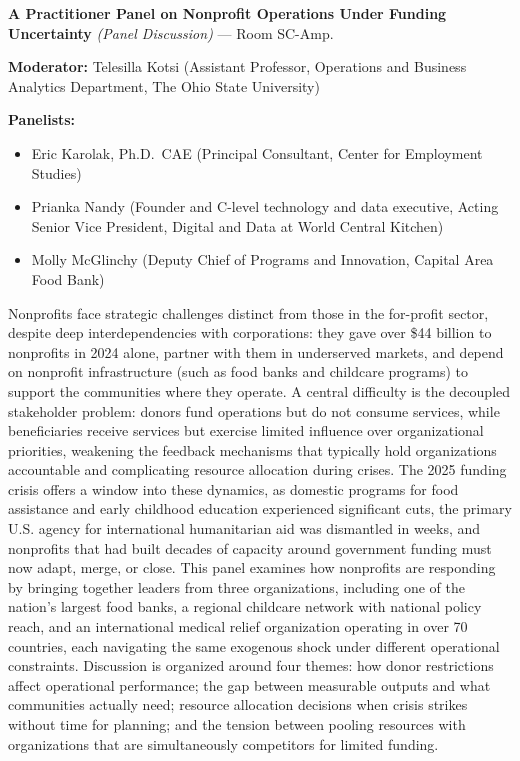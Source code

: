 \documentclass[
  10pt,
  letterpaper,
  DIV=11,
  numbers=noendperiod]{scrartcl}
\providecommand{\tightlist}{%
  \setlength{\itemsep}{0pt}\setlength{\parskip}{0pt}}\usepackage{longtable,booktabs,array}
\begin{document}
\textbf{A Practitioner Panel on Nonprofit Operations Under Funding
Uncertainty} \emph{(Panel Discussion)} --- Room SC-Amp.

\textbf{Moderator:} Telesilla Kotsi (Assistant Professor, Operations and
Business Analytics Department, The Ohio State University)

\textbf{Panelists:}

\begin{itemize}
\tightlist
\item
  Eric Karolak, Ph.D.~CAE (Principal Consultant, Center for Employment
  Studies)
\item
  Prianka Nandy (Founder and C-level technology and data executive,
  Acting Senior Vice President, Digital and Data at World Central
  Kitchen)
\item
  Molly McGlinchy (Deputy Chief of Programs and Innovation, Capital Area
  Food Bank)
\end{itemize}

Nonprofits face strategic challenges distinct from those in the
for-profit sector, despite deep interdependencies with corporations:
they gave over \$44 billion to nonprofits in 2024 alone, partner with
them in underserved markets, and depend on nonprofit infrastructure
(such as food banks and childcare programs) to support the communities
where they operate. A central difficulty is the decoupled stakeholder
problem: donors fund operations but do not consume services, while
beneficiaries receive services but exercise limited influence over
organizational priorities, weakening the feedback mechanisms that
typically hold organizations accountable and complicating resource
allocation during crises. The 2025 funding crisis offers a window into
these dynamics, as domestic programs for food assistance and early
childhood education experienced significant cuts, the primary U.S.
agency for international humanitarian aid was dismantled in weeks, and
nonprofits that had built decades of capacity around government funding
must now adapt, merge, or close. This panel examines how nonprofits are
responding by bringing together leaders from three organizations,
including one of the nation's largest food banks, a regional childcare
network with national policy reach, and an international medical relief
organization operating in over 70 countries, each navigating the same
exogenous shock under different operational constraints. Discussion is
organized around four themes: how donor restrictions affect operational
performance; the gap between measurable outputs and what communities
actually need; resource allocation decisions when crisis strikes without
time for planning; and the tension between pooling resources with
organizations that are simultaneously competitors for limited funding.
\end{document}

